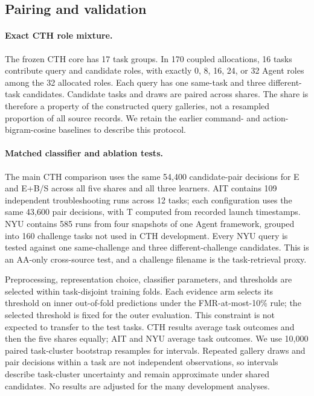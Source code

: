\documentclass[10pt]{article}
\begin{document}
\FloatBarrier
\subsection{Pairing and validation}
\paragraph{Exact CTH role mixture.} The frozen CTH core has 17 task groups. In 170 coupled allocations, 16 tasks contribute query and candidate roles, with exactly 0, 8, 16, 24, or 32 Agent roles among the 32 allocated roles. Each query has one same-task and three different-task candidates. Candidate tasks and draws are paired across shares. The share is therefore a property of the constructed query galleries, not a resampled proportion of all source records. We retain the earlier command- and action-bigram-cosine baselines to describe this protocol.

\paragraph{Matched classifier and ablation tests.} The main CTH comparison uses the same 54,400 candidate-pair decisions for E and E+B/S across all five shares and all three learners. AIT contains 109 independent troubleshooting runs across 12 tasks; each configuration uses the same 43,600 pair decisions, with T computed from recorded launch timestamps. NYU contains 585 runs from four snapshots of one Agent framework, grouped into 160 challenge tasks not used in CTH development. Every NYU query is tested against one same-challenge and three different-challenge candidates. This is an AA-only cross-source test, and a challenge filename is the task-retrieval proxy.

Preprocessing, representation choice, classifier parameters, and thresholds are selected within task-disjoint training folds. Each evidence arm selects its threshold on inner out-of-fold predictions under the FMR-at-most-10\% rule; the selected threshold is fixed for the outer evaluation. This constraint is not expected to transfer to the test tasks. CTH results average task outcomes and then the five shares equally; AIT and NYU average task outcomes. We use 10,000 paired task-cluster bootstrap resamples for intervals. Repeated gallery draws and pair decisions within a task are not independent observations, so intervals describe task-cluster uncertainty and remain approximate under shared candidates. No results are adjusted for the many development analyses.
\end{document}
